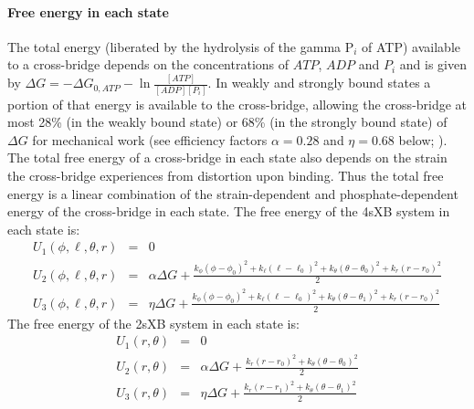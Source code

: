 \documentclass[]{article}
\begin{document}
\paragraph{Free energy in each state} %
The total energy (liberated by the hydrolysis of the gamma P$_i$ of ATP) available to a cross-bridge depends on the concentrations of $ATP$, $ADP$ and $P_i$ and is given by $\Delta G = -\Delta G_{0,ATP} - \ln \frac{[ATP]}{[ADP] [P_i]}$. 
In weakly and strongly bound states a portion of that energy is available to the cross-bridge, allowing the cross-bridge at most 28\% (in the weakly bound state) or 68\% (in the strongly bound state) of $\Delta G$ for mechanical work (see efficiency factors $\alpha=0.28$ and $\eta=0.68$ below; \citet{Pate1989, Tanner2007}).
The total free energy of a cross-bridge in each state also depends on the strain the cross-bridge experiences from distortion upon binding.
Thus the total free energy is a linear combination of the strain-dependent and phosphate-dependent energy of the cross-bridge in each state.
The free energy of the 4sXB system in each state is: 
\begin{eqnarray}
\label{4sEnergy}
U_1(\phi,\ell,\theta,r) & = & 0 \nonumber \\
U_2(\phi,\ell,\theta,r) & = & \alpha \Delta G + \frac{k_\phi (\phi-\phi_0)^2 + k_\ell (\ell-\ell_0)^2 + k_\theta (\theta-\theta_0)^2 + k_r (r-r_0)^2}{2} \nonumber \\
U_3(\phi,\ell,\theta,r) & = & \eta \Delta G + \frac{k_\phi (\phi-\phi_0)^2 + k_\ell (\ell-\ell_0)^2 + k_\theta (\theta-\theta_1)^2 + k_r (r-r_0)^2}{2} \nonumber
\end{eqnarray}
The free energy of the 2sXB system in each state is: 
\begin{eqnarray}
\label{2sEnergy}
	U_1(r,\theta) & = & 0 \nonumber \\
    U_2(r,\theta) & = & \alpha \Delta G + \frac{k_r (r - r_0)^2 + 
                        k_\theta (\theta - \theta_0)^2}{2} \nonumber \\
    U_3(r,\theta) & = & \eta \Delta G   + \frac{k_r (r - r_1)^2 + 
                        k_\theta (\theta - \theta_1)^2}{2} \nonumber
\end{eqnarray}
\end{document}
